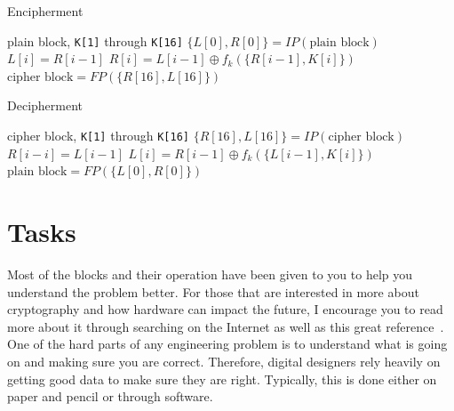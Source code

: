 \documentclass{article}
\begin{document}
\begin{algorithm}
\caption{Encipherment}\label{alg:encrypt}
\begin{algorithmic}
\Require plain block, \verb!K[1]! through \verb!K[16]!
\State $\{L[0], R[0]\} = IP(\text{plain block})$
\State $L[i] = R[i-1]$
\State $R[i] = L[i-1] \oplus f_k(\{R[i-1], K[i]\})$
\EndFor
\State $\text{cipher block} = FP(\{R[16], L[16]\})$
\end{algorithmic}
\end{algorithm}

\begin{algorithm}
\caption{Decipherment}\label{alg:decrypt}
\begin{algorithmic}
\Require cipher block, \verb!K[1]! through \verb!K[16]!
\State $\{R[16], L[16]\} = IP(\text{cipher block})$
\State $R[i-i] = L[i-1]$
\State $L[i] = R[i-1] \oplus f_k(\{L[i-1], K[i]\})$
\EndFor
\State $\text{plain block} = FP(\{L[0], R[0]\})$
\end{algorithmic}
\end{algorithm}
  
\section{Tasks}

Most of the blocks and their operation
have been given to you to help you understand the
problem better.
For those that are interested in more about cryptography and how
hardware can impact the future, I encourage you to read more about it
through searching on the Internet as well as this great
reference~\cite{10.5555/1721909}.
One of the hard parts of any engineering problem is
to understand what is going on and making sure you are correct.
Therefore, digital designers rely heavily on getting good data to make
sure they are right.  Typically, this is done either on paper and
pencil or through software.
\end{document}

